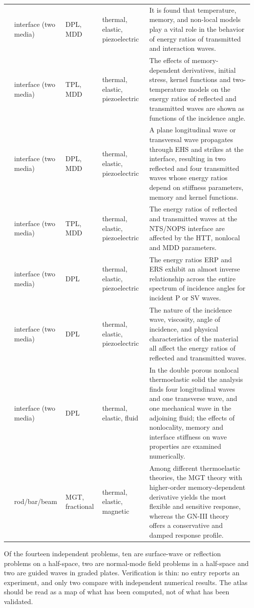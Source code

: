 {\begin{longtable}{p{1.9cm}p{2.0cm}p{1.7cm}p{2.6cm}p{5.0cm}}
\citet{Barak2023IJP} & interface (two media) & DPL, MDD & thermal, elastic, piezoelectric & It is found that temperature, memory, and non-local models play a vital role in the behavior of energy ratios of transmitted and interaction waves. \\
\citet{Barak2023JTS} & interface (two media) & TPL, MDD & thermal, elastic, piezoelectric & The effects of memory-dependent derivatives, initial stress, kernel functions and two-temperature models on the energy ratios of reflected and transmitted waves are shown as functions of the incidence angle. \\
\citet{Barak2023MMMS} & interface (two media) & DPL, MDD & thermal, elastic, piezoelectric & A plane longitudinal wave or transversal wave propagates through EHS and strikes at the interface, resulting in two reflected and four transmitted waves whose energy ratios depend on stiffness parameters, memory and kernel functions. \\
\citet{Gupta2023Energy} & interface (two media) & TPL, MDD & thermal, elastic, piezoelectric & The energy ratios of reflected and transmitted waves at the NTS/NOPS interface are affected by the HTT, nonlocal and MDD parameters. \\
\citet{Kumar2024} & interface (two media) & DPL & thermal, elastic, piezoelectric & The energy ratios ERP and ERS exhibit an almost inverse relationship across the entire spectrum of incidence angles for incident P or SV waves. \\
\citet{Kumar2024a} & interface (two media) & DPL & thermal, elastic, piezoelectric & The nature of the incidence wave, viscosity, angle of incidence, and physical characteristics of the material all affect the energy ratios of reflected and transmitted waves. \\
\citet{Kumar2025} & interface (two media) & DPL & thermal, elastic, fluid & In the double porous nonlocal thermoelastic solid the analysis finds four longitudinal waves and one transverse wave, and one mechanical wave in the adjoining fluid; the effects of nonlocality, memory and interface stiffness on wave properties are examined numerically. \\
\citet{Sur2025} & rod/bar/beam & MGT, fractional & thermal, elastic, magnetic & Among different thermoelastic theories, the MGT theory with higher-order memory-dependent derivative yields the most flexible and sensitive response, whereas the GN-III theory offers a conservative and damped response profile. \\
\end{longtable}
}

\begin{summarybox}[Summary]
Of the fourteen independent problems, ten are surface-wave or reflection problems on a half-space, two are normal-mode field problems in a half-space and two are guided waves in graded plates. Verification is thin: no entry reports an experiment, and only two compare with independent numerical results. The atlas should be read as a map of what has been computed, not of what has been validated.
\end{summarybox}
